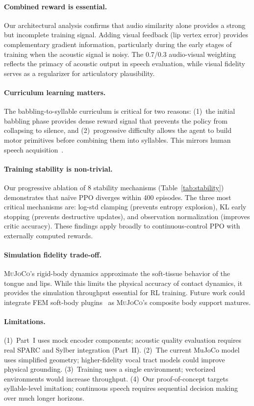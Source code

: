 \documentclass[11pt, a4paper]{article}
\newcommand{\mujoco}{\textsc{MuJoCo}}
\begin{document}
\paragraph{Combined reward is essential.}
Our architectural analysis confirms that audio similarity alone provides a strong but incomplete training signal. Adding visual feedback (lip vertex error) provides complementary gradient information, particularly during the early stages of training when the acoustic signal is noisy. The 0.7/0.3 audio-visual weighting reflects the primacy of acoustic output in speech evaluation, while visual fidelity serves as a regularizer for articulatory plausibility.

\paragraph{Curriculum learning matters.}
The babbling-to-syllable curriculum is critical for two reasons: (1)~the initial babbling phase provides dense reward signal that prevents the policy from collapsing to silence, and (2)~progressive difficulty allows the agent to build motor primitives before combining them into syllables. This mirrors human speech acquisition~\cite{kubicek2019articulatory}.

\paragraph{Training stability is non-trivial.}
Our progressive ablation of 8 stability mechanisms (Table~\ref{tab:stability}) demonstrates that na\"ive PPO diverges within 400 episodes. The three most critical mechanisms are: log-std clamping (prevents entropy explosion), KL early stopping (prevents destructive updates), and observation normalization (improves critic accuracy). These findings apply broadly to continuous-control PPO with externally computed rewards.

\paragraph{Simulation fidelity trade-off.}
\mujoco{}'s rigid-body dynamics approximate the soft-tissue behavior of the tongue and lips. While this limits the physical accuracy of contact dynamics, it provides the simulation throughput essential for RL training. Future work could integrate FEM soft-body plugins~\cite{freeman2023artisynth} as \mujoco{}'s composite body support matures.

\paragraph{Limitations.}
(1)~Part~I uses mock encoder components; acoustic quality evaluation requires real SPARC and Sylber integration (Part~II). (2)~The current MuJoCo model uses simplified geometry; higher-fidelity vocal tract models could improve physical grounding. (3)~Training uses a single environment; vectorized environments would increase throughput. (4)~Our proof-of-concept targets syllable-level imitation; continuous speech requires sequential decision making over much longer horizons.
\end{document}
